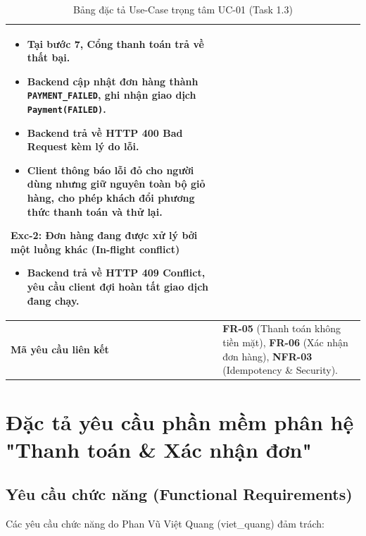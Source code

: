 \documentclass[a4paper]{article}
\begin{document}
\begin{table}[h!]
\begin{tabular}{|p{3.5cm}|p{11.5cm}|}
\begin{itemize}
    \item Tại bước 7, Cổng thanh toán trả về thất bại.
    \item Backend cập nhật đơn hàng thành \texttt{PAYMENT\_FAILED}, ghi nhận giao dịch \texttt{Payment(FAILED)}.
    \item Backend trả về HTTP 400 Bad Request kèm lý do lỗi.
    \item Client thông báo lỗi đỏ cho người dùng nhưng \textbf{giữ nguyên toàn bộ giỏ hàng}, cho phép khách đổi phương thức thanh toán và thử lại.
\end{itemize}
\textbf{Exc-2: Đơn hàng đang được xử lý bởi một luồng khác (In-flight conflict)}
\begin{itemize}
    \item Backend trả về HTTP 409 Conflict, yêu cầu client đợi hoàn tất giao dịch đang chạy.
\end{itemize} \\ \hline
\textbf{Mã yêu cầu liên kết} & \textbf{FR-05} (Thanh toán không tiền mặt), \textbf{FR-06} (Xác nhận đơn hàng), \textbf{NFR-03} (Idempotency \& Security). \\ \hline
\end{tabular}
\caption{Bảng đặc tả Use-Case trọng tâm UC-01 (Task 1.3)}
\end{table}

\newpage
\section{Đặc tả yêu cầu phần mềm phân hệ "Thanh toán \& Xác nhận đơn"}

\subsection{Yêu cầu chức năng (Functional Requirements)}
Các yêu cầu chức năng do Phan Vũ Việt Quang (viet\_quang) đảm trách:
\end{document}
